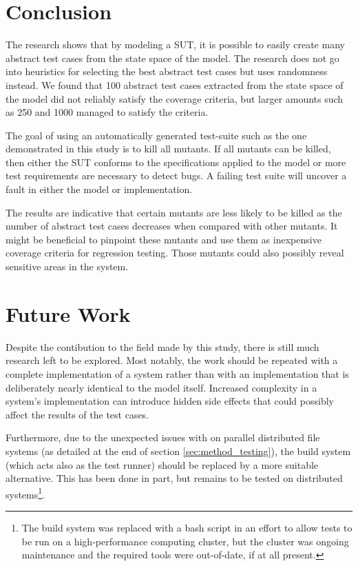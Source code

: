 \documentclass{article}
\begin{document}
	\section{Conclusion}
		The research shows that by modeling a SUT, it is possible to easily create many abstract test cases from the state space of the model. The research does not go into heuristics for selecting the best abstract test cases but uses randomness instead. We found that 100 abstract test cases extracted from the state space of the model did not reliably satisfy the coverage criteria, but larger amounts such as 250 and 1000 managed to satisfy the criteria.

		The goal of using an automatically generated test-suite such as the one demonstrated in this study is to kill all mutants. If all mutants can be killed, then either the SUT conforms to the specifications applied to the model or more test requirements are necessary to detect bugs. A failing test suite will uncover a fault in either the model or implementation.

		The results are indicative that certain mutants are less likely to be killed as the number of abstract test cases decreases when compared with other mutants. It might be beneficial to pinpoint these mutants and use them as inexpensive coverage criteria for regression testing. Those mutants could also possibly reveal sensitive areas in the system.

	\section{Future Work}
		Despite the contibution to the field made by this study, there is still much research left to be explored. Most notably, the work should be repeated with a complete implementation of a system rather than with an implementation that is deliberately nearly identical to the model itself. Increased complexity in a system's implementation can introduce hidden side effects that could possibly affect the results of the test cases.

		Furthermore, due to the unexpected issues with \citeauthor{sbt} on parallel distributed file systems (as detailed at the end of section \ref{sec:method_testing}), the build system (which acts also as the test runner) should be replaced by a more suitable alternative. This has been done in part, but remains to be tested on distributed systems\footnote{The build system was replaced with a bash script in an effort to allow tests to be run on a high-performance computing cluster, but the cluster was ongoing maintenance and the required tools were out-of-date, if at all present.}.
\end{document}
